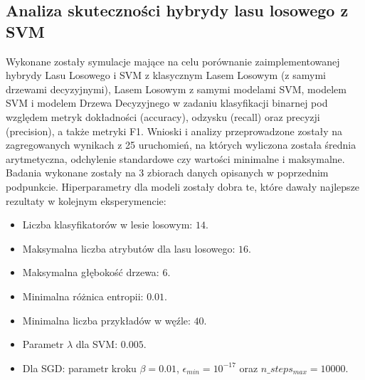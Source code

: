 \documentclass[
    left=2.5cm,         %
    right=2.5cm,        %
    top=2.5cm,          %
    bottom=3cm,         %
    bindingoffset=6mm,  %
    nohyphenation=false %
]{eiti/eiti-report}
\begin{document}
\subsection{Analiza skuteczności hybrydy lasu losowego z SVM}
Wykonane zostały symulacje mające na celu porównanie zaimplementowanej hybrydy Lasu Losowego i SVM z klasycznym Lasem Losowym (z samymi drzewami decyzyjnymi), Lasem Losowym z samymi modelami SVM, modelem SVM i modelem Drzewa Decyzyjnego w zadaniu klasyfikacji binarnej pod względem metryk dokładności (accuracy), odzysku (recall) oraz precyzji (precision), a także metryki F1. Wnioski i analizy przeprowadzone zostały na zagregowanych wynikach z 25 uruchomień, na których wyliczona została średnia arytmetyczna, odchylenie standardowe czy wartości minimalne i maksymalne. Badania wykonane zostały na 3 zbiorach danych opisanych w poprzednim podpunkcie.
Hiperparametry dla modeli zostały dobra te, które dawały najlepsze rezultaty w kolejnym eksperymencie:
\begin{itemize}
    \item Liczba klasyfikatorów w lesie losowym: $14$.
    \item Maksymalna liczba atrybutów dla lasu losowego: $16$.
    \item Maksymalna głębokość drzewa: $6$.
    \item Minimalna różnica entropii: $0.01$.
    \item Minimalna liczba przykładów w węźle: $40$.
    \item Parametr $\lambda$ dla SVM: $0.005$.
    \item Dla SGD: parametr kroku $\beta=0.01$, $\epsilon_{min}=10^{-17}$ oraz  $n\_steps_{max}=10000$.
\end{itemize}
\end{document}
